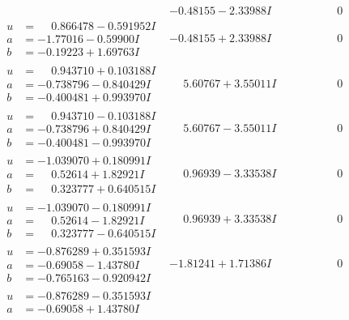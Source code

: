 \documentclass[1p]{elsarticle_modified}
\theoremstyle{definition}
\begin{document}
$$\begin{array}{c|c|c}
 & -0.48155 - 2.33988 I & \phantom{-0.000000 } 0 \\ \hline\begin{aligned}
u &= \phantom{-}0.866478 - 0.591952 I \\
a &= -1.77016 - 0.59900 I \\
b &= -0.19223 + 1.69763 I\end{aligned}
 & -0.48155 + 2.33988 I & \phantom{-0.000000 } 0 \\ \hline\begin{aligned}
u &= \phantom{-}0.943710 + 0.103188 I \\
a &= -0.738796 - 0.840429 I \\
b &= -0.400481 + 0.993970 I\end{aligned}
 & \phantom{-}5.60767 + 3.55011 I & \phantom{-0.000000 } 0 \\ \hline\begin{aligned}
u &= \phantom{-}0.943710 - 0.103188 I \\
a &= -0.738796 + 0.840429 I \\
b &= -0.400481 - 0.993970 I\end{aligned}
 & \phantom{-}5.60767 - 3.55011 I & \phantom{-0.000000 } 0 \\ \hline\begin{aligned}
u &= -1.039070 + 0.180991 I \\
a &= \phantom{-}0.52614 + 1.82921 I \\
b &= \phantom{-}0.323777 + 0.640515 I\end{aligned}
 & \phantom{-}0.96939 - 3.33538 I & \phantom{-0.000000 } 0 \\ \hline\begin{aligned}
u &= -1.039070 - 0.180991 I \\
a &= \phantom{-}0.52614 - 1.82921 I \\
b &= \phantom{-}0.323777 - 0.640515 I\end{aligned}
 & \phantom{-}0.96939 + 3.33538 I & \phantom{-0.000000 } 0 \\ \hline\begin{aligned}
u &= -0.876289 + 0.351593 I \\
a &= -0.69058 - 1.43780 I \\
b &= -0.765163 - 0.920942 I\end{aligned}
 & -1.81241 + 1.71386 I & \phantom{-0.000000 } 0 \\ \hline\begin{aligned}
u &= -0.876289 - 0.351593 I \\
a &= -0.69058 + 1.43780 I \\

\end{aligned}
\end{array}$$
\end{document}
